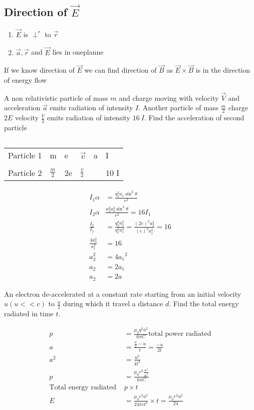 \subsection{Direction of $\vec{E}$}
\begin{enumerate}
	\item $\vec{E}$ is $\perp^{r}$ to $\vec{r}$
	\item $\vec{a}, \vec{r}$ and $\vec{E}$ lies in oneplanne
\end{enumerate}
If we know direction of $\vec{E} $ we  can find direction of $\vec{B}$ as $\vec{E}\times\vec{B}$ is in the direction of energy flow
\begin{exercise}
	A non relativistic particle of mass $m$ and charge moving with velocity $\vec{V}$ and acceleration $\vec{a}$ emits radiation of intensity $I$. Another particle of mass $\frac{m}{2}$ charge $2E$ velocity $\frac{V}{2}$ emits radiation of intensity $16 \ I$. Find the acceleration of second particle 
\end{exercise}
\begin{answer}$\left. \right. $\\
\begin{tabular}{p{2cm}p{1cm}p{0.5cm}p{0.5cm}p{0.5cm}p{0.7cm}}
	Particle 1&m&e&$\vec{v}$&a&I\\\\
	Particle 2&$\frac{m}{2}$&2e&$\frac{v}{2}$& &10 I\\
\end{tabular}
\begin{align*}
I_{1} \alpha &= \frac{q_{1}^{2} a _1\sin ^{2} \theta}{r^{2}}\\
I_{2} \alpha &\frac{a_{2}^{2} a_{2}^{2} \sin ^{2} \theta}{r^{2}}=16 I_{1}\\
\frac{I_{2}}{I_{1}}&=\frac{q_{2}^{2} a_{2}^{2}}{q_{1} ^2 a_{1}^{2}}=\frac{(2 e)^{2} a_{2}^{2}}{(e)^{2} a_{1}^{2}}=16\\
\frac{4 a_{2}^{2}}{a_{1}^{2}}&=16\\
a_{2}^{2}&=4 a_{1}{ }^{2}\\
a_{2}&=2 a_{1}\\
a_{2}&=2 a
\end{align*}
\end{answer}
\begin{exercise}
	An electron de-accelerated at a constant rate starting from an initial velocity $u(u<<c)$ to $\frac{u}{2}$ during which it travel a distance $d$. Find the total energy radiated in time $t$.
\end{exercise}
\begin{answer}
	\begin{align*}
	p&=\frac{\mu_{0}q^2 a^2}{6\pi C}\text{total power radiated}\\
	a&=\frac{\frac{u}{2}-u}{t}=\frac{-u}{2t}\\
	a^{2}&= \frac{u^{2}}{4 t^{2}}\\
	p&=\frac{\mu_{0}e^2\frac{u^2}{4t^2}}{6\pi C}\\
	\text{Total energy radiated }&p\times t\\
	E&=\frac{\mu_{0}e^2a^2}{24 \pi ct^2}\times t=\frac{\mu_{0}e^2u^2}{24}
	\end{align*}
\end{answer}
